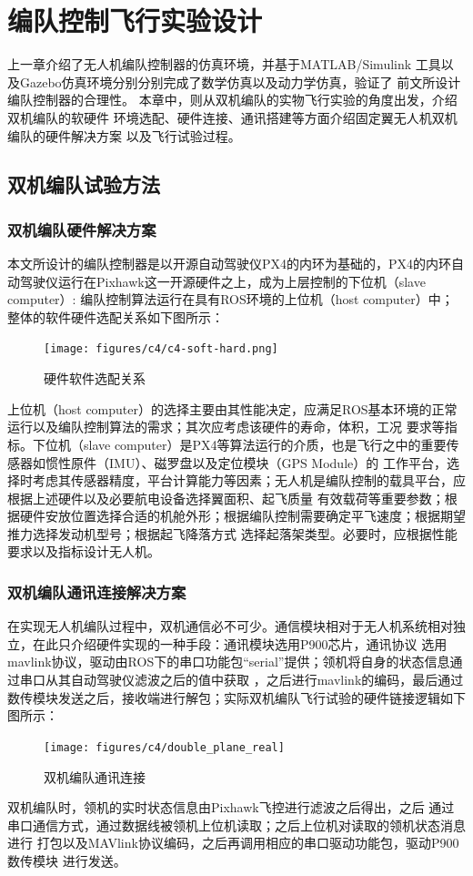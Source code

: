 \chapter{编队控制飞行实验设计}%
\label{chap:simulatin_expermient}
上一章介绍了无人机编队控制器的仿真环境，并基于MATLAB/Simulink
工具以及Gazebo仿真环境分别分别完成了数学仿真以及动力学仿真，验证了
前文所设计编队控制器的合理性。
本章中，则从双机编队的实物飞行实验的角度出发，介绍双机编队的软硬件
环境选配、硬件连接、通讯搭建等方面介绍固定翼无人机双机编队的硬件解决方案
以及飞行试验过程。
\section{双机编队试验方法}
\subsection{双机编队硬件解决方案}
本文所设计的编队控制器是以开源自动驾驶仪PX4的内环为基础的，PX4的内环自动驾驶仪运行在Pixhawk这一开源硬件之上，成为上层控制的下位机（slave computer）:
编队控制算法运行在具有ROS环境的上位机（host computer）中；
整体的软件硬件选配关系如下图所示：
\begin{figure}[H]
    \centering
    \texttt{[image: figures/c4/c4-soft-hard.png]}
    \caption{硬件软件选配关系}\label{fig:c4-soft-hard.png}
\end{figure}
上位机（host computer）的选择主要由其性能决定，应满足ROS基本环境的正常运行以及编队控制算法的需求；其次应考虑该硬件的寿命，体积，工况
要求等指标。下位机（slave computer）是PX4等算法运行的介质，也是飞行之中的重要传感器如惯性原件（IMU）、磁罗盘以及定位模块（GPS Module）的
工作平台，选择时考虑其传感器精度，平台计算能力等因素；无人机是编队控制的载具平台，应根据上述硬件以及必要航电设备选择翼面积、起飞质量
有效载荷等重要参数；根据硬件安放位置选择合适的机舱外形；根据编队控制需要确定平飞速度；根据期望推力选择发动机型号；根据起飞降落方式
选择起落架类型。必要时，应根据性能要求以及指标设计无人机。
\subsection{双机编队通讯连接解决方案}
在实现无人机编队过程中，双机通信必不可少。通信模块相对于无人机系统相对独立，在此只介绍硬件实现的一种手段：通讯模块选用P900芯片，通讯协议
选用mavlink协议，驱动由ROS下的串口功能包“serial”提供；领机将自身的状态信息通过串口从其自动驾驶仪滤波之后的值中获取
，之后进行mavlink的编码，最后通过数传模块发送之后，接收端进行解包；实际双机编队飞行试验的硬件链接逻辑如下图所示：
\begin{figure}[H]
    \centering
    \texttt{[image: figures/c4/double\_plane\_real]}
    \caption{双机编队通讯连接}\label{fig:c4-double_plane_real}
\end{figure}
双机编队时，领机的实时状态信息由Pixhawk飞控进行滤波之后得出，之后
通过串口通信方式，通过数据线被领机上位机读取；之后上位机对读取的领机状态消息进行
打包以及MAVlink协议编码，之后再调用相应的串口驱动功能包，驱动P900数传模块
进行发送。

